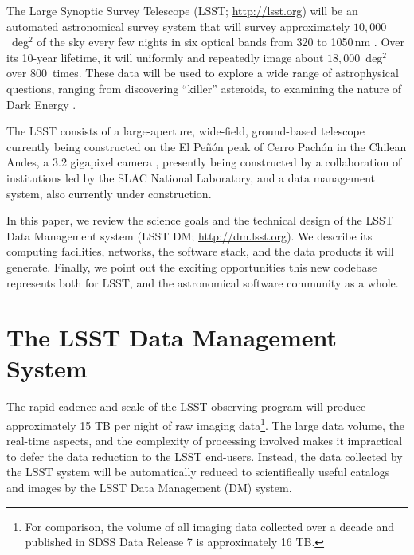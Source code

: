 \documentclass[11pt,twoside]{article}
\begin{document}
The Large Synoptic Survey Telescope (LSST; \url{http://lsst.org}) will be an
automated astronomical survey system that will survey approximately
$10,000$~deg$^2$ of the sky every few nights in six optical bands from 320 
to 1050\,nm \citep{2008arXiv0805.2366I}. Over its 10-year lifetime, it will
uniformly and repeatedly image about $18,000$~deg$^2$ over $800$~times. 
These data will be used to explore
a wide range of astrophysical questions, ranging from discovering
``killer'' asteroids, to examining the nature of Dark Energy
\citep[e.g., see][]{2009arXiv0912.0201L}.

The LSST consists of a large-aperture, wide-field, ground-based telescope \citep{2014SPIE.9145E..1AG}
currently being constructed on the El Pe\~n\'{o}n peak of Cerro Pach\'{o}n in the Chilean
Andes, a 3.2 gigapixel camera \citep{2010SPIE.7735E..0JK}, presently being constructed by a collaboration
of institutions led by the SLAC National Laboratory, and a data management
system, also currently under construction.

In this paper, we review the science goals and the technical design of the
LSST Data Management system (LSST DM; \url{http://dm.lsst.org}). We describe its computing facilities, networks,
the software stack, and the data products it will generate. Finally, we 
point out the exciting opportunities this new codebase represents both for LSST,
and the astronomical software community as a whole.

\section{ The LSST Data Management System }
\label{sec:dm}

The rapid cadence and scale of the LSST observing program will produce
approximately 15 TB per night of raw imaging data\footnote{For
  comparison, the volume of all imaging data collected over a decade
  and published in SDSS Data Release 7 \citep{2009ApJS..182..543A} is approximately 16 TB.}. The large data volume, the real-time aspects, and the complexity of processing involved makes it impractical to defer the data reduction to the LSST end-users. Instead, the data collected by the LSST system will be automatically reduced to scientifically useful catalogs and images by the LSST Data Management (DM) system.
\\
\end{document}
